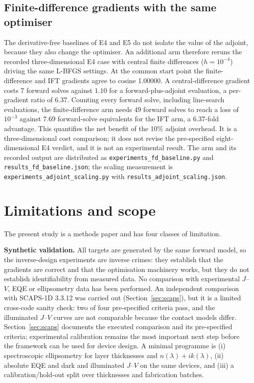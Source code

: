 \documentclass[preprint,12pt]{elsarticle}
\begin{document}
\subsection{Finite-difference gradients with the same optimiser}
\label{sec:evidence-cost}

The derivative-free baselines of E4 and E5 do not isolate the value of the
adjoint, because they also change the optimiser. An additional arm therefore
reruns the recorded three-dimensional E4 case with central finite differences
($h=10^{-4}$) driving the same L-BFGS settings. At the common start point
the finite-difference and IFT gradients agree to cosine 1.00000. A
central-difference gradient costs 7 forward solves against
$1.10$ for a forward-plus-adjoint evaluation, a per-gradient ratio of
6.37. Counting every forward solve, including line-search
evaluations, the finite-difference arm needs 49 forward solves to
reach a loss of $10^{-3}$ against 7.69 forward-solve equivalents for
the IFT arm, a 6.37-fold advantage. This quantifies the net benefit
of the 10\% adjoint overhead. It is a three-dimensional cost comparison; it
does not revise the pre-specified eight-dimensional E4 verdict, and it is
not an experimental result. The arm and its recorded output are distributed
as \texttt{experiments\_fd\_baseline.py} and
\texttt{results\_fd\_baseline.json}; the scaling measurement is
\texttt{experiments\_adjoint\_scaling.py} with
\texttt{results\_adjoint\_scaling.json}.


\section{Limitations and scope}
\label{sec:limitations}

The present study is a methods paper and has four classes of limitation.

\textbf{Synthetic validation.} All targets are generated by the same forward
model, so the inverse-design experiments are inverse crimes: they establish
that the gradients are correct and that the optimisation machinery works, but
they do not establish identifiability from measured data. No comparison with
experimental $J$--$V$, EQE or ellipsometry data has been performed. An
independent comparison with SCAPS-1D 3.3.12 was carried out
(Section~\ref{sec:scaps}), but it is a limited cross-code sanity
check: two of four pre-specified criteria pass, and the illuminated
$J$--$V$ curves are not comparable because the contact models differ. Section~\ref{sec:scaps} documents the executed comparison and its
pre-specified criteria; experimental calibration remains the most
important next step before the framework can be used for device design.
A minimal programme is (i) spectroscopic ellipsometry for layer
thicknesses and $n(\lambda)+ik(\lambda)$, (ii) absolute EQE and dark
and illuminated $J$--$V$ on the same devices, and (iii) a
calibration/hold-out split over thicknesses and fabrication batches.
\end{document}

